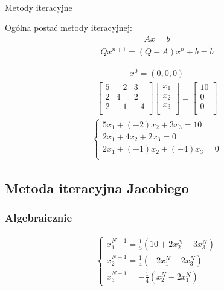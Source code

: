 \documentclass[main.tex]{subfiles}
\begin{document}
    \hfill \\
    \begin{center}{\large Metody iteracyjne}\end{center}
    Ogólna postać metody iteracyjnej:
    \begin{align*}
        Ax = b
    \end{align*}
    \begin{align*}
        Qx^{n+1} = (Q - A)x^n + b = \tilde{b}
    \end{align*}

    \begin{align*}
        x^0 = (0,0,0)
    \end{align*}
    \begin{align*}
        \begin{bmatrix}
            5 & -2 & 3\\
            2 & 4 & 2\\
            2 & -1 & -4\\
        \end{bmatrix}
        \begin{bmatrix}
            x_1\\
            x_2\\
            x_3\\
        \end{bmatrix}
        =
        \begin{bmatrix}
            10\\
            0\\
            0\\
        \end{bmatrix}
    \end{align*}
    \begin{align*}
        \left\{\begin{matrix}
                   5x_1 + (-2)x_2 + 3x_3 = 10\\
                   2x_1 + 4x_2 + 2x_3 = 0\\
                   2x_1 + (-1)x_2 + (-4)x_3 = 0\\
        \end{matrix}\right.
    \end{align*}

    \subsection{Metoda iteracyjna Jacobiego}

    \subsubsection{Algebraicznie}
    \begin{align*}
        \left\{\begin{matrix}
                   x^{N+1}_1 = \frac{1}{5}(10 + 2x^N_2 - 3x^N_3)\\
                   x^{N+1}_2 = \frac{1}{4}(-2x^N_1 - 2x^N_3)\\
                   x^{N+1}_3 = -\frac{1}{4}(x^N_2 - 2x^N_1)
        \end{matrix}\right.
    \end{align*}
\end{document}
